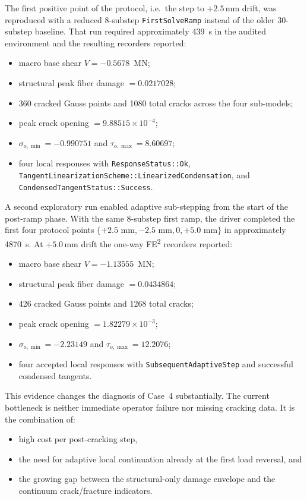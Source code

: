 The first positive point of the protocol, i.e.\ the step to \(+2.5\)\,mm
drift, was reproduced with a reduced 8-substep \texttt{FirstSolveRamp} instead
of the older 30-substep baseline.  That run required approximately 439~s in
the audited environment and the resulting recorders reported:
\begin{itemize}
  \item macro base shear \(V = -0.5678\)~MN;
  \item structural peak fiber damage \(= 0.0217028\);
  \item 360 cracked Gauss points and 1080 total cracks across the four
    sub-models;
  \item peak crack opening \(= 9.88515\times 10^{-4}\);
  \item \(\sigma_{o,\min} = -0.990751\) and \(\tau_{o,\max} = 8.60697\);
  \item four local responses with \texttt{ResponseStatus::Ok},
    \texttt{TangentLinearizationScheme::LinearizedCondensation}, and
    \texttt{CondensedTangentStatus::Success}.
\end{itemize}

A second exploratory run enabled adaptive sub-stepping from the start of the
post-ramp phase.  With the same 8-substep first ramp, the driver completed the
first four protocol points
\(\{+2.5\text{ mm}, -2.5\text{ mm}, 0, +5.0\text{ mm}\}\) in
approximately 4870~s.  At \(+5.0\)\,mm drift the one-way
FE\textsuperscript{2} recorders reported:
\begin{itemize}
  \item macro base shear \(V = -1.13555\)~MN;
  \item structural peak fiber damage \(= 0.0434864\);
  \item 426 cracked Gauss points and 1268 total cracks;
  \item peak crack opening \(= 1.82279\times 10^{-3}\);
  \item \(\sigma_{o,\min} = -2.23149\) and \(\tau_{o,\max} = 12.2076\);
  \item four accepted local responses with
    \texttt{SubsequentAdaptiveStep} and successful condensed tangents.
\end{itemize}

This evidence changes the diagnosis of Case~4 substantially.  The current
bottleneck is neither immediate operator failure nor missing cracking data.
It is the combination of:
\begin{itemize}
  \item high cost per post-cracking step,
  \item the need for adaptive local continuation already at the first load
    reversal, and
  \item the growing gap between the structural-only damage envelope and the
    continuum crack/fracture indicators.
\end{itemize}

